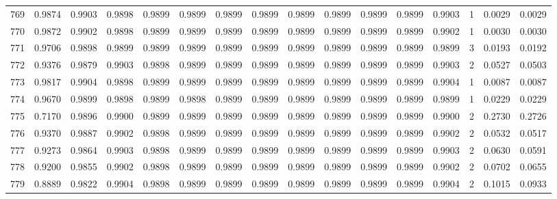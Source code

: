 \begin{tabular}{lrrrrrrrrrrrrrrr}
769 &      0.9874 &  0.9903 &  0.9898 &  0.9899 &  0.9899 &  0.9899 &  0.9899 &  0.9899 &  0.9899 &  0.9899 &   0.9899 &     0.9903 &      1 &                    0.0029 &                     0.0029 \\
770 &      0.9872 &  0.9902 &  0.9898 &  0.9899 &  0.9899 &  0.9899 &  0.9899 &  0.9899 &  0.9899 &  0.9899 &   0.9899 &     0.9902 &      1 &                    0.0030 &                     0.0030 \\
771 &      0.9706 &  0.9898 &  0.9899 &  0.9899 &  0.9899 &  0.9899 &  0.9899 &  0.9899 &  0.9899 &  0.9899 &   0.9899 &     0.9899 &      3 &                    0.0193 &                     0.0192 \\
772 &      0.9376 &  0.9879 &  0.9903 &  0.9898 &  0.9899 &  0.9899 &  0.9899 &  0.9899 &  0.9899 &  0.9899 &   0.9899 &     0.9903 &      2 &                    0.0527 &                     0.0503 \\
773 &      0.9817 &  0.9904 &  0.9898 &  0.9899 &  0.9899 &  0.9899 &  0.9899 &  0.9899 &  0.9899 &  0.9899 &   0.9899 &     0.9904 &      1 &                    0.0087 &                     0.0087 \\
774 &      0.9670 &  0.9899 &  0.9898 &  0.9899 &  0.9898 &  0.9899 &  0.9899 &  0.9899 &  0.9899 &  0.9899 &   0.9899 &     0.9899 &      1 &                    0.0229 &                     0.0229 \\
775 &      0.7170 &  0.9896 &  0.9900 &  0.9899 &  0.9899 &  0.9899 &  0.9899 &  0.9899 &  0.9899 &  0.9899 &   0.9899 &     0.9900 &      2 &                    0.2730 &                     0.2726 \\
776 &      0.9370 &  0.9887 &  0.9902 &  0.9898 &  0.9899 &  0.9899 &  0.9899 &  0.9899 &  0.9899 &  0.9899 &   0.9899 &     0.9902 &      2 &                    0.0532 &                     0.0517 \\
777 &      0.9273 &  0.9864 &  0.9903 &  0.9898 &  0.9899 &  0.9899 &  0.9899 &  0.9899 &  0.9899 &  0.9899 &   0.9899 &     0.9903 &      2 &                    0.0630 &                     0.0591 \\
778 &      0.9200 &  0.9855 &  0.9902 &  0.9898 &  0.9899 &  0.9899 &  0.9899 &  0.9899 &  0.9899 &  0.9899 &   0.9899 &     0.9902 &      2 &                    0.0702 &                     0.0655 \\
779 &      0.8889 &  0.9822 &  0.9904 &  0.9898 &  0.9899 &  0.9899 &  0.9899 &  0.9899 &  0.9899 &  0.9899 &   0.9899 &     0.9904 &      2 &                    0.1015 &                     0.0933 \\

\end{tabular}
